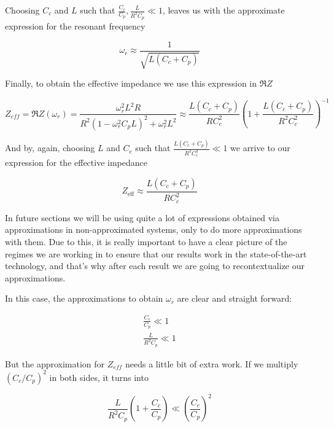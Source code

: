 \documentclass[../main.tex]{subfiles}
\begin{document}
Choosing \(C_{c}\) and \(L\) such that
\(\frac{C_{c}}{C_{p}}, \frac{L}{R^2 C_{p}} \ll 1\), leaves us with the
approximate expression for the resonant frequency

\begin{equation}
\label{eq:Wr}
\omega_{r} \approx \frac{1}{\sqrt{L (C_{c} + C_{p})}}
\end{equation}

Finally, to obtain the effective impedance we use this expression in \(\Re Z\)

\begin{equation}
\label{eq:ExactZeff}
    Z_{eff} = \Re Z(\omega_{r}) =
    \frac{\omega_{r}^2 L^2 R}{R^2(1-\omega_{r}^2C_{p}L)^2 + \omega_{r}^2 L^2}
    \approx \frac{L (C_{c} + C_{p})}{R C_{c}^2}
      \left(1 + \frac{L (C_{c} + C_{p})}{R^2 C_{c}^2}\right)^{-1}
\end{equation}

And by, again, choosing \(L\) and \(C_{c}\) such that
\(\frac{L (C_{c} + C_{p})}{R^2 C_{c}^2} \ll 1\) we arrive to our expression for
the effective impedance

\begin{equation}
\label{eq:Zeff}
    Z_{\text{eff}} \approx \frac{L (C_{c} + C_{p})}{R C_{c}^2}
\end{equation}

In future sections we will be using quite a lot of expressions obtained via
approximations in non-approximated systems, only to do more approximations
with them. Due to this, it is really important to have a clear picture of
the regimes we are working in to ensure that our results work in the
state-of-the-art technology, and that's why after each result we are going to
recontextualize our approximations.

In this case, the approximations to obtain \(\omega_{r}\) are clear and
straight forward:

\begin{gather}
    \frac{C_{c}}{C_{p}} \ll 1 \label{eq:ApproxCcWr}\\
    \frac{L}{R^2 C_{p}} \ll 1 \label{eq:ApproxLWr}
\end{gather}

But the approximation for \(Z_{eff}\) needs a little bit of extra work. If we
multiply \((C_{c} / C_{p})^2\) in both sides, it turns into

\begin{equation}
\label{eq:ProtoZeffCond}
    \frac{L}{R^2 C_{p}} \left(1 + \frac{C_{c}}{C_{p}}\right) \ll
    \left(\frac{C_{c}}{C_{p}}\right)^2
\end{equation}
\end{document}
